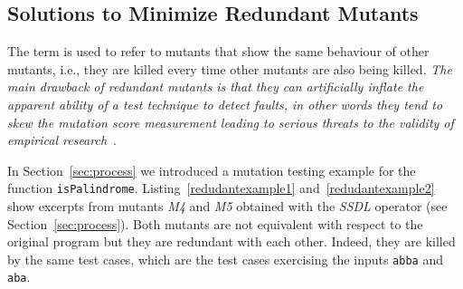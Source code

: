 
\subsection{Solutions to Minimize Redundant Mutants}
\label{sec:opt:redundant}

The term  is used to refer to mutants that show the same behaviour of other mutants, i.e., they
are killed every time other mutants are also being killed. 
\emph{The main drawback of redundant mutants is that they can artificially inflate the apparent ability of a test technique to detect faults, in other words they tend to skew the mutation score measurement leading to serious threats to the validity of empirical research}~\cite{papadakis2016threats}.




In Section~\ref{sec:process} we introduced a mutation testing example for the function \texttt{isPalindrome}. 
Listing~\ref{redudantexample1} and~\ref{redudantexample2} show excerpts from mutants \textit{M4} and \textit{M5} obtained with the \textit{SSDL} operator (see Section~\ref{sec:process}). Both mutants are not equivalent with respect to the original program but they are redundant with each other. Indeed, they are killed by the same test cases, which are the test cases exercising the inputs \texttt{abba} and \texttt{aba}.

